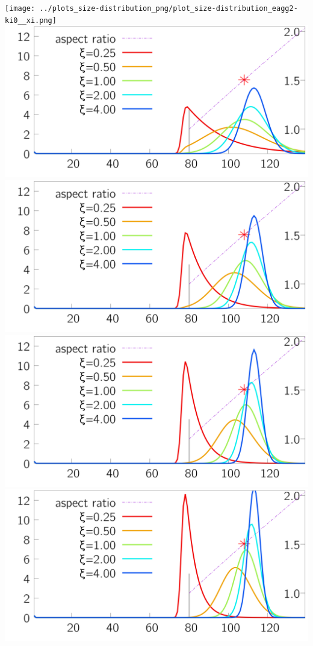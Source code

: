 \begin{minipage}{0.25\textwidth} 
 \texttt{[image: ../plots\_size-distribution\_png/plot\_size-distribution\_eagg2-ki0\_\_xi.png]}
\includegraphics[width=\textwidth ]{../plots_size-distribution_png/plot_size-distribution_eagg2-ki1__xi.png}
\includegraphics[width=\textwidth ]{../plots_size-distribution_png/plot_size-distribution_eagg2-ki2__xi.png}
\includegraphics[width=\textwidth ]{../plots_size-distribution_png/plot_size-distribution_eagg2-ki3__xi.png}
\includegraphics[width=\textwidth ]{../plots_size-distribution_png/plot_size-distribution_eagg2-ki4__xi.png}
\end{minipage}%

